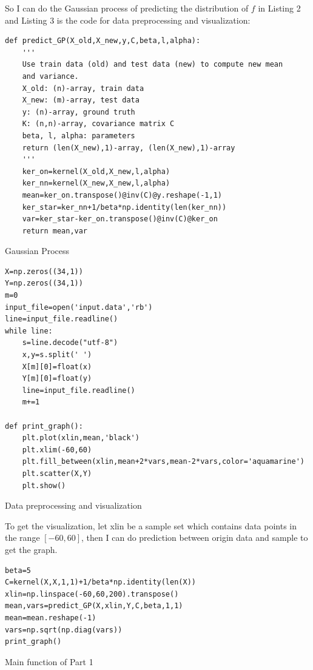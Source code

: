 \documentclass{article}
\begin{document}
So I can do the Gaussian process of predicting the distribution of $f$ in Listing 2 and Listing 3 is the code for data preprocessing and visualization:

\begin{listing}[!ht]
\begin{verbatim}
def predict_GP(X_old,X_new,y,C,beta,l,alpha):
    '''
    Use train data (old) and test data (new) to compute new mean 
    and variance.
    X_old: (n)-array, train data
    X_new: (m)-array, test data
    y: (n)-array, ground truth
    K: (n,n)-array, covariance matrix C
    beta, l, alpha: parameters
    return (len(X_new),1)-array, (len(X_new),1)-array
    '''
    ker_on=kernel(X_old,X_new,l,alpha)
    ker_nn=kernel(X_new,X_new,l,alpha)
    mean=ker_on.transpose()@inv(C)@y.reshape(-1,1)
    ker_star=ker_nn+1/beta*np.identity(len(ker_nn))
    var=ker_star-ker_on.transpose()@inv(C)@ker_on
    return mean,var
\end{verbatim}
\caption{Gaussian Process}
\label{listing}
\end{listing}

\begin{listing}[!ht]
\begin{verbatim}
X=np.zeros((34,1))
Y=np.zeros((34,1))
m=0
input_file=open('input.data','rb')
line=input_file.readline()
while line:
    s=line.decode("utf-8")
    x,y=s.split(' ')
    X[m][0]=float(x)
    Y[m][0]=float(y)
    line=input_file.readline()
    m+=1
    
def print_graph():
    plt.plot(xlin,mean,'black')
    plt.xlim(-60,60)
    plt.fill_between(xlin,mean+2*vars,mean-2*vars,color='aquamarine')
    plt.scatter(X,Y)
    plt.show()
\end{verbatim}
\caption{Data preprocessing and visualization}
\label{listing}
\end{listing}

\newpage

To get the visualization, let xlin be a sample set which contains data points in the range $[-60,60]$, then I can do prediction between origin data and sample to get the graph.
\begin{listing}[!ht]
\begin{verbatim}
beta=5
C=kernel(X,X,1,1)+1/beta*np.identity(len(X))
xlin=np.linspace(-60,60,200).transpose()
mean,vars=predict_GP(X,xlin,Y,C,beta,1,1)
mean=mean.reshape(-1)
vars=np.sqrt(np.diag(vars))
print_graph()
\end{verbatim}
\caption{Main function of Part 1}
\label{listing}
\end{listing}
\end{document}
